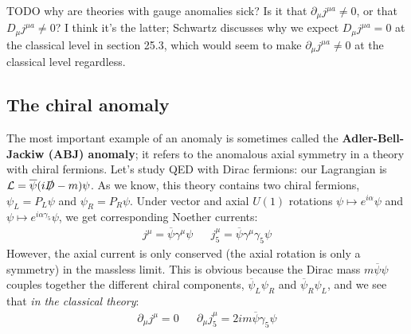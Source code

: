 \documentclass[11pt, oneside]{article}   	%
\theoremstyle{definition}
\numberwithin{equation}{subsection}		%
\begin{document}
{\color{red} TODO why are theories with gauge anomalies sick? Is it that $\partial_\mu j^{\mu a}\neq 0$, or that $D_\mu j^{\mu a}\neq 0$? I think it's the 
latter; Schwartz discusses why we expect $D_\mu j^{\mu a} = 0$ at the classical level in section 25.3, which would seem to make $\partial_\mu j^{\mu a}\neq 0$ 
at the classical level regardless.}

\subsection{The chiral anomaly}

The most important example of an anomaly is sometimes called the \textbf{Adler-Bell-Jackiw (ABJ) anomaly}; it refers to the anomalous axial 
symmetry in a theory with chiral fermions. Let's study QED with Dirac fermions: our Lagrangian is $\mathcal L = \overline\psi (i\slashed D - m)\psi$. 
As we know, this theory contains two chiral fermions, $\psi_L = P_L\psi$ and $\psi_R = P_R\psi$. Under vector and axial $U(1)$ rotations 
$\psi\mapsto e^{i\alpha}\psi$ and $\psi\mapsto e^{i\alpha\gamma_5}\psi$, we get corresponding Noether currents:
\begin{align}
	j^\mu = \overline\psi \gamma^\mu\psi && j_5^\mu = \overline\psi\gamma^\mu\gamma_5\psi
\end{align}
However, the axial current is only conserved (the axial rotation is only a symmetry) in the massless limit. This is obvious because the Dirac mass 
$m\overline\psi\psi$ couples together the different chiral components, $\overline\psi_L\psi_R$ and $\overline\psi_R\psi_L$, and we see that 
\textit{in the classical theory}:
\begin{align}
	\partial_\mu j^\mu = 0 && \partial_\mu j_5^\mu = 2im \overline\psi \gamma_5 \psi
\end{align}
\end{document}
